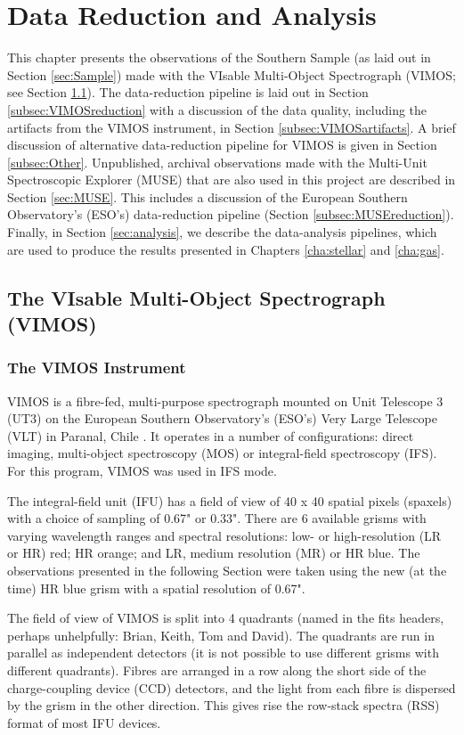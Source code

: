 \chapter{Data Reduction and Analysis}
	\label{cha:Data}
This chapter presents the observations of the Southern Sample (as laid out in Section \ref{sec:Sample}) made with the VIsable Multi-Object Spectrograph (VIMOS; see Section \ref{sec:VIMOS}). The data-reduction pipeline is laid out in Section \ref{subsec:VIMOSreduction} with a discussion of the data quality, including the artifacts from the VIMOS instrument, in Section \ref{subsec:VIMOSartifacts}. A brief discussion of alternative data-reduction pipeline for VIMOS is given in Section \ref{subsec:Other}. Unpublished, archival observations made with the Multi-Unit Spectroscopic Explorer (MUSE) that are also used in this project are described in Section \ref{sec:MUSE}. This includes a discussion of the European Southern Observatory's (ESO's) data-reduction pipeline (Section \ref{subsec:MUSEreduction}). Finally, in Section \ref{sec:analysis}, we describe the data-analysis pipelines, which are used to produce the results presented in Chapters \ref{cha:stellar} and \ref{cha:gas}.  

\section{The VIsable Multi-Object Spectrograph (VIMOS)}
	\label{sec:VIMOS}
	\subsection{The VIMOS Instrument}
		VIMOS is a fibre-fed, multi-purpose spectrograph mounted on Unit Telescope 3 (UT3) on the European Southern Observatory's (ESO's) Very Large Telescope (VLT) in Paranal, Chile \citep{LeFevre2003}. It operates in a number of configurations: direct imaging, multi-object spectroscopy (MOS) or integral-field spectroscopy (IFS). For this program, VIMOS was used in IFS mode. 

		The integral-field unit (IFU) has a field of view of 40 x 40 spatial pixels (spaxels) with a choice of sampling of 0.67" or 0.33". There are 6 available grisms with varying wavelength ranges and spectral resolutions: low- or high-resolution (LR or HR) red; HR orange; and LR, medium resolution (MR) or HR blue. The observations presented in the following Section were taken using the new (at the time) HR blue grism with a spatial resolution of 0.67". 

		The field of view of VIMOS is split into 4 quadrants (named in the fits headers, perhaps unhelpfully: Brian, Keith, Tom and David). The quadrants are run in parallel as independent detectors (it is not possible to use different grisms with different quadrants). Fibres are arranged in a row along the short side of the charge-coupling device (CCD) detectors, and the light from each fibre is dispersed by the grism in the other direction. This gives rise the row-stack spectra (RSS) format of most IFU devices.

